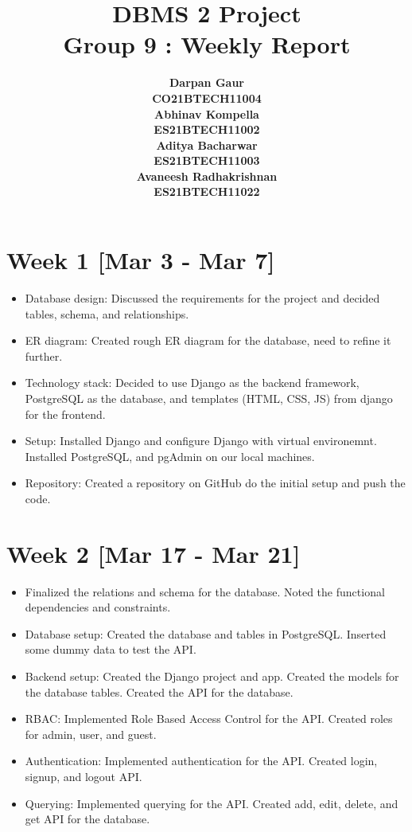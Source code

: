 \documentclass[11pt]{article}
\title{
    \textbf{DBMS 2 Project} \\ 
    \textbf{Group 9 : Weekly Report} \\
}
\author{
    \begin{tabular}{c}
        \textbf{Darpan Gaur} \\
        \textbf{CO21BTECH11004}
    \end{tabular}
    \begin{tabular}{c}
        \textbf{Abhinav Kompella} \\
        \textbf{ES21BTECH11002}
    \end{tabular}
    \begin{tabular}{c}
        \textbf{Aditya Bacharwar} \\
        \textbf{ES21BTECH11003}
    \end{tabular}
    \begin{tabular}{c}
        \textbf{Avaneesh Radhakrishnan} \\
        \textbf{ES21BTECH11022}
    \end{tabular}
}
\date{}
\begin{document}
\maketitle

\hrulefill

\section*{Week 1 [Mar 3 - Mar 7]}
\begin{itemize}
    \item Database design: Discussed the requirements for the project and decided tables, schema, and relationships.  
    \item ER diagram: Created rough ER diagram for the database, need to refine it further.
    \item Technology stack: Decided to use Django as the backend framework, PostgreSQL as the database, and templates (HTML, CSS, JS) from django for the frontend. 
    \item Setup: Installed Django and configure Django with virtual environemnt. Installed PostgreSQL, and pgAdmin on our local machines.
    \item Repository: Created a repository on GitHub do the initial setup and push the code.
\end{itemize}

\section*{Week 2 [Mar 17 - Mar 21]}
\begin{itemize}
    \item Finalized the relations and schema for the database. Noted the functional dependencies and constraints.
    \item Database setup: Created the database and tables in PostgreSQL. Inserted some dummy data to test the API. 
    \item Backend setup: Created the Django project and app. Created the models for the database tables. Created the API for the database.
    \item RBAC: Implemented Role Based Access Control for the API. Created roles for admin, user, and guest.
    \item Authentication: Implemented authentication for the API. Created login, signup, and logout API.
    \item Querying: Implemented querying for the API. Created add, edit, delete, and get API for the database.
\end{itemize}
\end{document}
